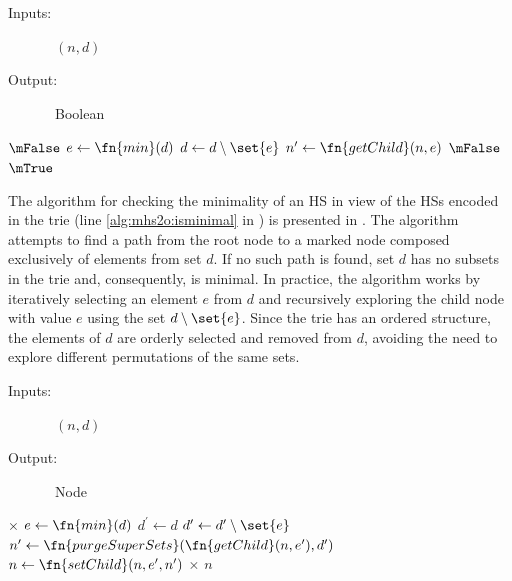\begin{algorithm}[ht]
  \begin{description}
  \item[Inputs:]\ $(n, d)$
  \item[Output:]\ Boolean
  \end{description}
  \begin{algorithmic}[1]
    \State \Return $\mFalse$
    \State $e \gets \fn{min}(d)$
    \State $d \gets d \setminus \set{e}$
    \State $n^\prime \gets \fn{getChild}(n, e)$
    \State \Return $\mFalse$
    \EndIf
    \EndWhile
    \EndIf
    \State \Return $\mTrue$

  \end{algorithmic}
  \caption{$\fn{isMinimal}$}
  \label{alg:mhs2o:isminimal-impl}
\end{algorithm}

The algorithm for checking the minimality of an \ac{HS} in view of the
\acp{HS} encoded in the trie (line \ref{alg:mhs2o:isminimal} in
) is presented in .
%
The algorithm attempts to find a path from the root node to a marked
node composed exclusively of elements from set $d$.
%
If no such path is found, set $d$ has no subsets in the trie and,
consequently, is minimal.
%
In practice, the algorithm works by iteratively selecting an element
$e$ from $d$ and recursively exploring the child node with value $e$
using the set $d\setminus\set{e}$.
%
Since the trie has an ordered structure, the elements of $d$ are
orderly selected and removed from $d$, avoiding the need to explore
different permutations of the same sets.

\begin{algorithm}[ht]
  \begin{description}
  \item[Inputs:]\ $(n, d)$
  \item[Output:]\ Node
  \end{description}

  \begin{algorithmic}[1]
    \State \Return $\times$
    \Else
    \State $e \gets \fn{min}(d)$
    \State $d^\prime \gets d$
    \State $d^\prime \gets d^\prime \setminus  \set{e}$
    \EndIf
    \State $n^\prime \gets \fn{purgeSuperSets}(\fn{getChild}(n, e^\prime),d^\prime)$
    \State $n \gets \fn{setChild}(n, e^\prime, n^\prime)$
    \EndFor
    \EndIf
    \State \Return $\times$
    \EndIf
    \State \Return $n$
  \end{algorithmic}
  \caption{$\fn{purgeSuperSets}$}
  \label{alg:mhs2o:purgesupersets}
\end{algorithm}

